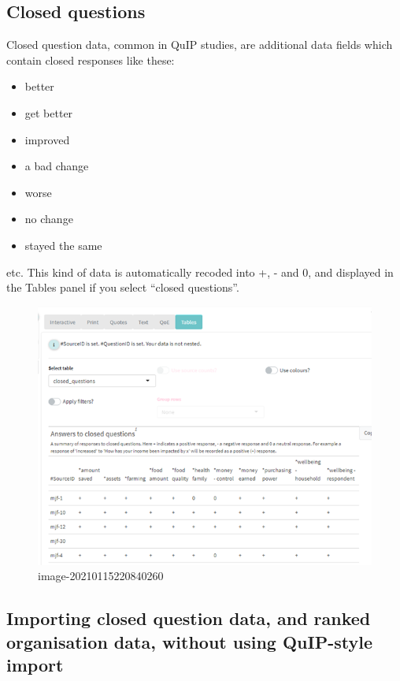 \documentclass[
]{book}
\begin{document}
\hypertarget{closed-questions}{%
\subsection{Closed questions}\label{closed-questions}}

Closed question data, common in QuIP studies, are additional data fields which contain closed responses like these:

\begin{itemize}
\item
  better
\item
  get better
\item
  improved
\item
  a bad change
\item
  worse
\item
  no change
\item
  stayed the same
\end{itemize}

etc. This kind of data is automatically recoded into +, - and 0, and displayed in the Tables panel if you select ``closed questions''.

\begin{figure}
\centering
\includegraphics{_assets/image-20210115220840260.png}
\caption{image-20210115220840260}
\end{figure}

\hypertarget{importing-closed-question-data-and-ranked-organisation-data-without-using-quip-style-import}{%
\subsection{Importing closed question data, and ranked organisation data, without using QuIP-style import}\label{importing-closed-question-data-and-ranked-organisation-data-without-using-quip-style-import}}
\end{document}
